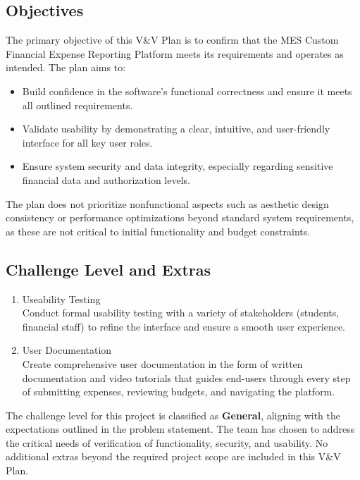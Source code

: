 \documentclass[12pt, titlepage]{article}
\begin{document}
\subsection{Objectives}

The primary objective of this V\&V Plan is to confirm that the MES Custom Financial Expense Reporting Platform meets its requirements and operates as intended. The plan aims to:
\begin{itemize}
    \item Build confidence in the software's functional correctness and ensure it meets all outlined requirements.
    \item Validate usability by demonstrating a clear, intuitive, and user-friendly interface for all key user roles.
    \item Ensure system security and data integrity, especially regarding sensitive financial data and authorization levels.
\end{itemize}

The plan does not prioritize nonfunctional aspects such as aesthetic design consistency or performance optimizations beyond standard system requirements, as these are not critical to initial functionality and budget constraints.

\subsection{Challenge Level and Extras}

\begin{enumerate}
  \item Useability Testing \\
  Conduct formal usability testing with a variety of stakeholders (students, financial staff) to refine the interface and ensure a smooth user experience.
  \item User Documentation \\
  Create comprehensive user documentation in the form of written documentation and video tutorials that guides end-users through every step of submitting expenses, reviewing budgets, and navigating the platform.
\end{enumerate}

The challenge level for this project is classified as \textbf{General}, aligning with the expectations outlined in the problem statement. The team has chosen to address the critical needs of verification of functionality, security, and usability. No additional extras beyond the required project scope are included in this V\&V Plan.
\end{document}
